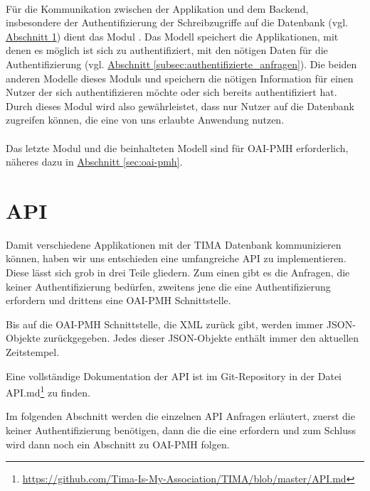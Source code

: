 \paragraph{} Für die Kommunikation zwischen der Applikation und dem Backend, insbesondere der Authentifizierung der Schreibzugriffe auf die Datenbank (vgl. \hyperref[sec:api]{Abschnitt \ref*{sec:api}}) dient das Modul . Das Modell  speichert die Applikationen, mit denen es möglich ist sich zu authentifiziert, mit den nötigen Daten für die Authentifizierung (vgl. \hyperref[subsec:authentifizierte_anfragen]{Abschnitt \ref*{subsec:authentifizierte_anfragen}}). Die beiden anderen Modelle dieses Moduls  und  speichern die nötigen Information für einen Nutzer der sich authentifizieren möchte oder sich bereits authentifiziert hat. Durch dieses Modul wird also gewährleistet, dass nur Nutzer auf die Datenbank zugreifen können, die eine von uns erlaubte Anwendung nutzen.

\paragraph{} Das letzte Modul und die beinhalteten Modell sind für OAI-PMH erforderlich, näheres dazu in \hyperref[sec:oai-pmh]{Abschnitt \ref*{sec:oai-pmh}}.


\section{API}\label{sec:api}
Damit verschiedene Applikationen mit der TIMA Datenbank kommunizieren können, haben
wir uns entschieden eine umfangreiche API zu implementieren. Diese lässt sich
grob in drei Teile gliedern. Zum einen gibt es die Anfragen, die keiner
Authentifizierung bedürfen, zweitens jene die eine Authentifizierung erfordern und
drittens eine OAI-PMH Schnittstelle.

Bis auf die OAI-PMH Schnittstelle, die XML zurück gibt, werden immer JSON-Objekte zurückgegeben. Jedes dieser JSON-Objekte enthält immer den aktuellen Zeitstempel.

Eine vollständige Dokumentation der API ist im Git-Repository in der Datei API.md\footnote{\url{https://github.com/Tima-Is-My-Association/TIMA/blob/master/API.md}} zu finden.

Im folgenden Abschnitt werden die einzelnen API Anfragen erläutert, zuerst die keiner Authentifizierung benötigen, dann die die eine erfordern und zum Schluss wird dann noch ein Abschnitt zu OAI-PMH folgen.

